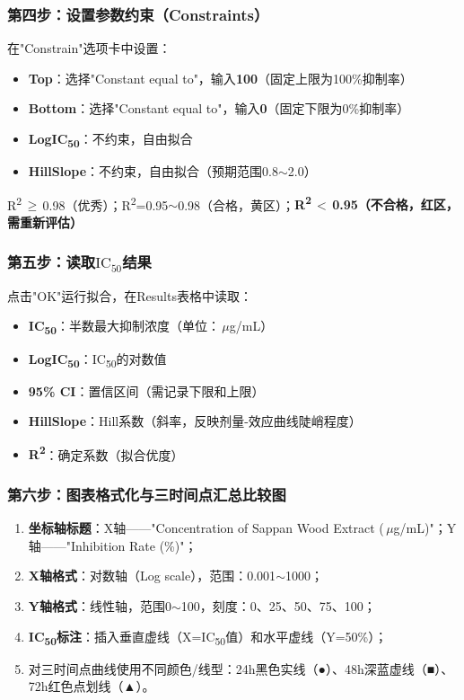 \documentclass[12pt,a4paper]{article}
\newcommand{\ic}{\ensuremath{\text{IC}_{50}}}
\newcommand{\um}{\,$\mu$g/mL}
\begin{document}
\subsubsection{第四步：设置参数约束（Constraints）}

在"Constrain"选项卡中设置：
\begin{itemize}
\item \textbf{Top}：选择"Constant equal to"，输入\textbf{100}（固定上限为100\%抑制率）
\item \textbf{Bottom}：选择"Constant equal to"，输入\textbf{0}（固定下限为0\%抑制率）
\item \textbf{LogIC\textsubscript{50}}：不约束，自由拟合
\item \textbf{HillSlope}：不约束，自由拟合（预期范围0.8$\sim$2.0）
\end{itemize}

\begin{warningbox}[title={⚠\ 拟合质量标准}]
R\textsuperscript{2}\,$\geq$\,0.98（优秀）；R\textsuperscript{2}=0.95$\sim$0.98（合格，黄区）；\textbf{R\textsuperscript{2}\,$<$\,0.95（不合格，红区，需重新评估）}
\end{warningbox}

\subsubsection{第五步：读取\ic{}结果}

点击"OK"运行拟合，在Results表格中读取：
\begin{itemize}
\item \textbf{IC\textsubscript{50}}：半数最大抑制浓度（单位：\um{}）
\item \textbf{LogIC\textsubscript{50}}：IC\textsubscript{50}的对数值
\item \textbf{95\% CI}：置信区间（需记录下限和上限）
\item \textbf{HillSlope}：Hill系数（斜率，反映剂量-效应曲线陡峭程度）
\item \textbf{R\textsuperscript{2}}：确定系数（拟合优度）
\end{itemize}

\subsubsection{第六步：图表格式化与三时间点汇总比较图}

\begin{enumerate}
\item \textbf{坐标轴标题}：X轴——"Concentration of Sappan Wood Extract (\um{})"；Y轴——"Inhibition Rate (\%)"；
\item \textbf{X轴格式}：对数轴（Log scale），范围：0.001$\sim$1000；
\item \textbf{Y轴格式}：线性轴，范围0$\sim$100，刻度：0、25、50、75、100；
\item \textbf{IC\textsubscript{50}标注}：插入垂直虚线（X=IC\textsubscript{50}值）和水平虚线（Y=50\%）；
\item 对三时间点曲线使用不同颜色/线型：24h黑色实线（●）、48h深蓝虚线（■）、72h红色点划线（▲）。
\end{enumerate}
\end{document}
